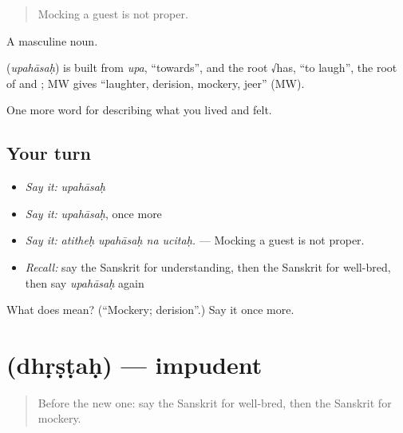 \begin{quote}
Mocking a guest is not proper.
\end{quote}

A masculine noun.

\begin{cousinweb}
\textbf{} (\emph{upahāsaḥ}) is built from \emph{upa}, \textquotedblleft{}towards\textquotedblright{}, and the root √has, \textquotedblleft{}to laugh\textquotedblright{}, the root of \textbf{} and \textbf{}; MW gives \textquotedblleft{}laughter, derision, mockery, jeer\textquotedblright{} (MW).
\end{cousinweb}

\begin{grammarlens}[title={What you've built}]
One more word for describing what you lived and felt.
\end{grammarlens}

\subsection*{Your turn}
\begin{itemize}
\raggedright
  \item \emph{Say it:} \emph{upahāsaḥ}
  \item \emph{Say it:} \emph{upahāsaḥ}, once more
  \item \emph{Say it:} \emph{atitheḥ upahāsaḥ na ucitaḥ.} — Mocking a guest is not proper.
  \item \emph{Recall:} say the Sanskrit for understanding, then the Sanskrit for well-bred, then say \emph{upahāsaḥ} again
\end{itemize}

\begin{tcolorbox}[breakable,colback=teal!4,colframe=teal!35!black,title={Before you move on}]
What does  mean? (\textquotedblleft{}Mockery; derision\textquotedblright{}.) Say it once more.
\end{tcolorbox}
\section[\texorpdfstring{\sk{धृष्टः} (dhṛṣṭaḥ)}{धृष्टः (dhṛṣṭaḥ)}]{ (dhṛṣṭaḥ) — impudent}

\label{lesson:SA-C467-dhrstah}



\begin{quote}
Before the new one: say the Sanskrit for well-bred, then the Sanskrit for mockery.
\end{quote}


